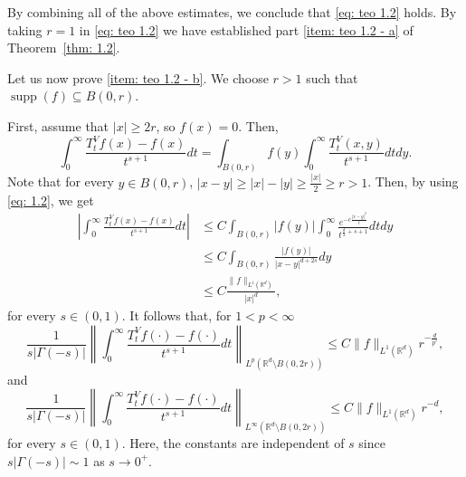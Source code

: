 \documentclass[10pt, a4paper, reqno]{amsart}
\theoremstyle{definition}
\theoremstyle{remark}
\DeclareMathOperator{\supp}{supp}
\newcommand{\RR}{\mathbb{R}}
\numberwithin{equation}{section}
\begin{document}
By combining all of the above estimates, we conclude that \eqref{eq: teo 1.2} holds. By taking $r=1$ in \eqref{eq: teo 1.2} we have established part \ref{item: teo 1.2 - a} of Theorem~\ref{thm: 1.2}.

Let us now prove \ref{item: teo 1.2 - b}. We choose $r>1$ such that $\supp(f)\subseteq B(0,r)$.

First, assume that $|x|\geq 2r$, so $f(x)=0$. Then,
\[\int_0^\infty \frac{T_t^Vf(x)-f(x)}{t^{s+1}}dt=\int_{B(0,r)}f(y)\int_0^\infty \frac{T_t^V(x,y)}{t^{s+1}}dt dy.\]
Note that for every $y\in B(0,r)$, $|x-y|\geq |x|-|y|\geq \frac{|x|}{2}\geq r>1$. Then, by using \eqref{eq: 1.2}, we get
\begin{align*}
    \left|\int_0^\infty \frac{T_t^Vf(x)-f(x)}{t^{s+1}}dt\right|&\leq C\int_{B(0,r)}|f(y)|\int_0^\infty \frac{e^{-c\frac{|x-y|^2}{t}}}{t^{\frac{d}{2}+s+1}}dtdy\\
    &\leq C \int_{B(0,r)} \frac{|f(y)|}{|x-y|^{d+2s}}dy\\
    &\leq C \frac{\|f\|_{L^1(\RR^d)}}{|x|^d}, 
\end{align*}
for every $s\in (0,1)$. It follows that, for $1<p<\infty$
\begin{equation}\label{eq: bound Lp out B}
    \frac{1}{s|\Gamma(-s)|}\left\|\int_0^\infty\frac{T_t^Vf(\cdot)-f(\cdot)}{t^{s+1}}dt\right\|_{L^p(\RR^d\setminus B(0,2r))}\leq C \|f\|_{L^1(\RR^d)} r^{-\frac{d}{p'}},
\end{equation}
and
\begin{equation}\label{eq: bound Linfty out B}
    \frac{1}{s|\Gamma(-s)|}\left\|\int_0^\infty\frac{T_t^Vf(\cdot)-f(\cdot)}{t^{s+1}}dt\right\|_{L^\infty(\RR^d\setminus B(0,2r))}\leq C \|f\|_{L^1(\RR^d)} r^{-d},
\end{equation}
for every $s\in (0,1)$. Here, the constants are independent of $s$ since $s|\Gamma(-s)|\sim 1$ as $s\to 0^+$.
\end{document}

